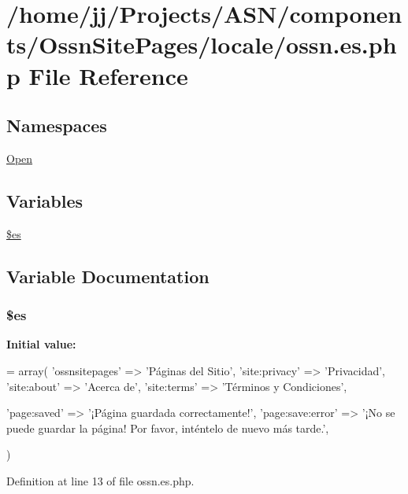 \hypertarget{components_2_ossn_site_pages_2locale_2ossn_8es_8php}{}\section{/home/jj/\+Projects/\+A\+S\+N/components/\+Ossn\+Site\+Pages/locale/ossn.es.\+php File Reference}
\label{components_2_ossn_site_pages_2locale_2ossn_8es_8php}
\subsection*{Namespaces}
\begin{DoxyCompactItemize}
\item 
 \hyperlink{namespace_open}{Open}
\end{DoxyCompactItemize}
\subsection*{Variables}
\begin{DoxyCompactItemize}
\item 
\hyperlink{components_2_ossn_site_pages_2locale_2ossn_8es_8php_a388cbda27103d2baee3997798d1f2744}{\$es}
\end{DoxyCompactItemize}


\subsection{Variable Documentation}
\subsubsection[{\texorpdfstring{\$es}{$es}}]{\setlength{\rightskip}{0pt plus 5cm}\$es}\hypertarget{components_2_ossn_site_pages_2locale_2ossn_8es_8php_a388cbda27103d2baee3997798d1f2744}{}\label{components_2_ossn_site_pages_2locale_2ossn_8es_8php_a388cbda27103d2baee3997798d1f2744}
{\bfseries Initial value\+:}
\begin{DoxyCode}
= array(
    \textcolor{stringliteral}{'ossnsitepages'} => \textcolor{stringliteral}{'Páginas del Sitio'},
    \textcolor{stringliteral}{'site:privacy'} => \textcolor{stringliteral}{'Privacidad'},
    \textcolor{stringliteral}{'site:about'} => \textcolor{stringliteral}{'Acerca de'},
    \textcolor{stringliteral}{'site:terms'} => \textcolor{stringliteral}{'Términos y Condiciones'},

    \textcolor{stringliteral}{'page:saved'} => \textcolor{stringliteral}{'¡Página guardada correctamente!'},
    \textcolor{stringliteral}{'page:save:error'} => \textcolor{stringliteral}{'¡No se puede guardar la página! Por favor, inténtelo de nuevo más tarde.'},

)
\end{DoxyCode}


Definition at line 13 of file ossn.\+es.\+php.


